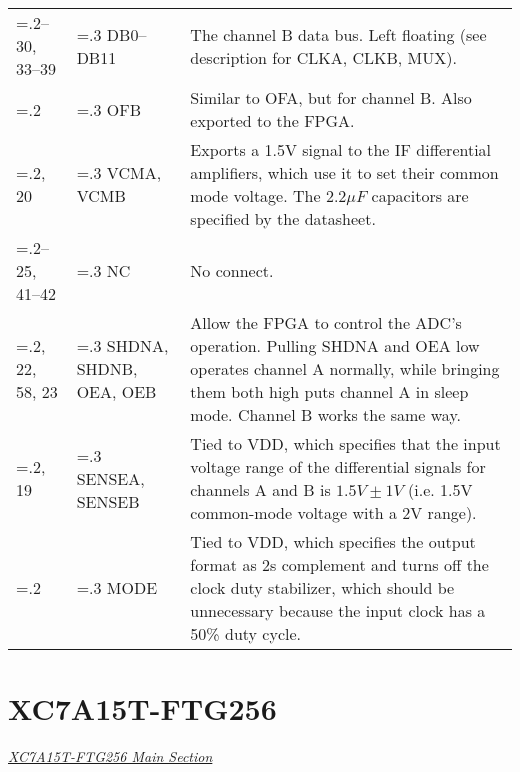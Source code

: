\begin{tabularx}{\textwidth}{>{\hsize=.2\hsize}X >{\hsize=.3\hsize}X X}
        26--30, 33--39     & DB0--DB11                  & The channel B data bus. Left floating (see
        description for CLKA, CLKB, MUX).                                                      \\
        40                 & OFB                        & Similar to OFA, but for channel B. Also
        exported to the FPGA\@.                                                                \\
        61, 20             & VCMA, VCMB                 & Exports a 1.5V signal to the IF differential amplifiers, which use it
        to set their common mode voltage. The $2.2 \si{\mu F}$ capacitors are specified by the
        datasheet.                                                                             \\
        24--25, 41--42     & NC                         & No connect.                          \\
        59, 22, 58, 23     & SHDNA, SHDNB, OEA, OEB     & Allow the FPGA to control the ADC's
        operation. Pulling SHDNA and OEA low operates channel A normally, while bringing them both
        high puts channel A in sleep mode. Channel B works the same way.                       \\
        62, 19             & SENSEA, SENSEB             & Tied to VDD, which specifies that the input voltage range of the
        differential signals for channels A and B is $1.5 \si{V} \pm 1
        \si{V}$ (i.e. 1.5V common-mode voltage with a 2V range).                               \\
        60                 & MODE                       & Tied to VDD, which specifies the output
        format as 2s complement and turns off the clock duty stabilizer, which should be unnecessary
        because the input clock has a 50\% duty cycle.                                         \\

        \bottomrule
\end{tabularx}

\section{XC7A15T-FTG256}
\label{sec:xc7a15t-ftg256-pinout}

\textit{\hyperref[sec:xc7a15t-ftg256]{XC7A15T-FTG256 Main Section}}

